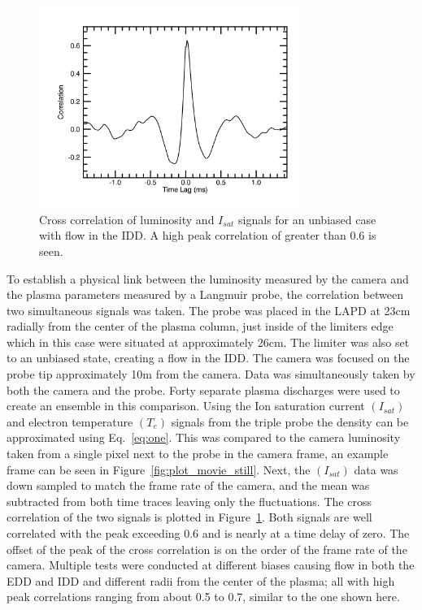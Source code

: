 \documentclass[%
 reprint,
 amsmath,amssymb,
 aps,
]{revtex4-1}
\begin{document}
\begin{figure}[!htbp]
\centerline{}
\includegraphics[width=8.5cm]{plot_Camera_probe_correlation_23cm_0V}
\caption{\label{fig:plot_Camera_probe_correlation_23cm_0V} Cross correlation of luminosity and $I_{sat}$ signals for an unbiased case with flow in the IDD.  A high peak correlation of greater than 0.6 is seen. }
\end{figure}

To establish a physical link between the luminosity measured by the camera and the plasma parameters measured by a Langmuir probe, the correlation between two simultaneous signals was taken. The probe was placed in the LAPD at 23cm radially from the center of the plasma column, just inside of the limiters edge which in this case were situated at approximately 26cm. The limiter was also set to an unbiased state, creating a flow in the IDD. The camera was focused on the probe tip approximately 10m from the camera. Data was simultaneously taken by both the camera and the probe. Forty separate plasma discharges were used to create an ensemble in this comparison. Using the Ion saturation current $(I_{sat})$ and electron temperature $(T_e)$ signals from the triple probe the density can be approximated using Eq.~\ref{eq:one}. This was compared to the camera luminosity taken from a single pixel next to the probe in the camera frame, an example frame can be seen in Figure~\ref{fig:plot_movie_still}. Next, the $(I_{sat})$ data was down sampled to match the frame rate of the camera, and the mean was subtracted from both time traces leaving only the fluctuations. The cross correlation of the two signals is plotted in Figure~\ref{fig:plot_Camera_probe_correlation_23cm_0V}. Both signals are well correlated with the peak exceeding 0.6 and is nearly at a time delay of zero. The offset of the peak of the cross correlation is on the order of the frame rate of the camera. Multiple tests were conducted at different biases causing flow in both the EDD and IDD and different radii from the center of the plasma; all with high peak correlations ranging from about 0.5 to 0.7, similar to the one shown here.
\end{document}
